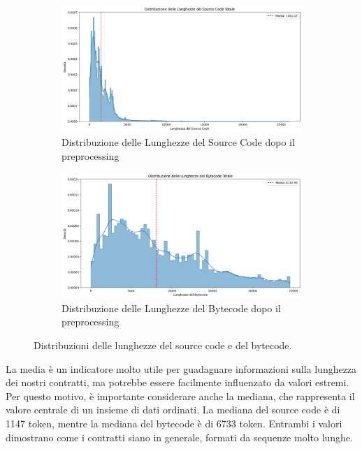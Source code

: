 \documentclass[../../Thesis.tex]{subfiles}
\begin{document}
\begin{figure}[htbp]
    \centering
    \begin{subfigure}[b]{0.49\textwidth}
        \centering
        \includegraphics[width=\textwidth]{../../img/SCTokensPreprocessed.png}
        \caption{Distribuzione delle Lunghezze del Source Code dopo il preprocessing}
        \label{fig:sourcecode_length_distribution}
    \end{subfigure}
    \hfill
    \begin{subfigure}[b]{0.49\textwidth}
        \centering
        \includegraphics[width=\textwidth]{../../img/BCTokensPreprocessed.png}
        \caption{Distribuzione delle Lunghezze del Bytecode dopo il preprocessing}
        \label{fig:bytecode_length_distribution}
    \end{subfigure}
    \caption{Distribuzioni delle lunghezze del source code e del bytecode.}
    \label{fig:length_distributions}
\end{figure}
La media \`e un indicatore molto utile per guadagnare informazioni sulla lunghezza dei nostri contratti, ma potrebbe essere facilmente influenzato da valori estremi. Per questo motivo, \`e importante considerare anche la mediana, che rappresenta il valore centrale di un insieme di dati ordinati. La mediana del source code \`e di 1147 token, mentre la mediana del bytecode \`e di 6733 token. Entrambi i valori dimostrano come i contratti siano in generale, formati da sequenze molto lunghe.
\end{document}
